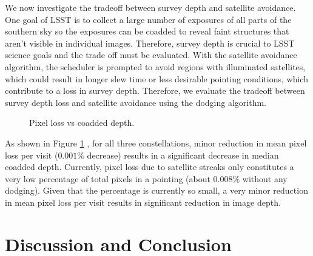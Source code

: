 \documentclass[linenumbers]{aastex631}
\begin{document}
We now investigate the tradeoff between survey depth and satellite avoidance. One goal of LSST is to collect a large number of exposures of all parts of the southern sky so the
exposures can be coadded to reveal faint structures that aren’t visible in individual images.
Therefore, survey depth is crucial to LSST science goals and the trade off must be evaluated.
With the satellite avoidance algorithm, the scheduler is prompted to avoid regions with
illuminated satellites, which could result in longer slew time or less desirable pointing
conditions, which contribute to a loss in survey depth. Therefore, we evaluate the tradeoff
between survey depth loss and satellite avoidance using the dodging algorithm.\\

\begin{figure}[ht!]
\caption{Pixel loss vs coadded depth. \label{fig-trade-off}}
\end{figure}

As shown in Figure \ref{fig-trade-off} , for all three constellations, minor reduction in mean pixel loss per visit
($0.001\%$ decrease) results in a significant decrease in median coadded depth. Currently, pixel
loss due to satellite streaks only constitutes a very low percentage of total pixels in a pointing
(about $0.008\%$ without any dodging). Given that the percentage is currently so small, a very
minor reduction in mean pixel loss per visit results in significant reduction in image depth.

\section{Discussion and Conclusion}
\end{document}
